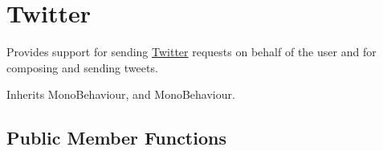 \hypertarget{class_voxel_busters_1_1_native_plugins_1_1_twitter}{}\section{Twitter}
\label{class_voxel_busters_1_1_native_plugins_1_1_twitter}


Provides support for sending \hyperlink{class_voxel_busters_1_1_native_plugins_1_1_twitter}{Twitter} requests on behalf of the user and for composing and sending tweets.  




Inherits Mono\+Behaviour, and Mono\+Behaviour.

\subsection*{Public Member Functions}
